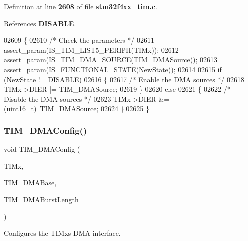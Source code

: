 Definition at line \textbf{ 2608} of file \textbf{ stm32f4xx\+\_\+tim.\+c}.



References \textbf{ D\+I\+S\+A\+B\+LE}.


\begin{DoxyCode}
02609 \{ 
02610   \textcolor{comment}{/* Check the parameters */}
02611   assert_param(IS_TIM_LIST5_PERIPH(TIMx)); 
02612   assert_param(IS_TIM_DMA_SOURCE(TIM\_DMASource));
02613   assert_param(IS_FUNCTIONAL_STATE(NewState));
02614   
02615   \textcolor{keywordflow}{if} (NewState != DISABLE)
02616   \{
02617     \textcolor{comment}{/* Enable the DMA sources */}
02618     TIMx->DIER |= TIM\_DMASource; 
02619   \}
02620   \textcolor{keywordflow}{else}
02621   \{
02622     \textcolor{comment}{/* Disable the DMA sources */}
02623     TIMx->DIER &= (uint16\_t)~TIM\_DMASource;
02624   \}
02625 \}
\end{DoxyCode}
\mbox{\label{group__TIM__Group5_gad7156f84c436c8ac92cd789611826d09}} 
\subsubsection{T\+I\+M\+\_\+\+D\+M\+A\+Config()}
{\footnotesize\ttfamily void T\+I\+M\+\_\+\+D\+M\+A\+Config (\begin{DoxyParamCaption}\item[{\textbf{ T\+I\+M\+\_\+\+Type\+Def} $\ast$}]{T\+I\+Mx,  }\item[{uint16\+\_\+t}]{T\+I\+M\+\_\+\+D\+M\+A\+Base,  }\item[{uint16\+\_\+t}]{T\+I\+M\+\_\+\+D\+M\+A\+Burst\+Length }\end{DoxyParamCaption})}



Configures the T\+I\+Mx\textquotesingle{}s D\+MA interface. 


